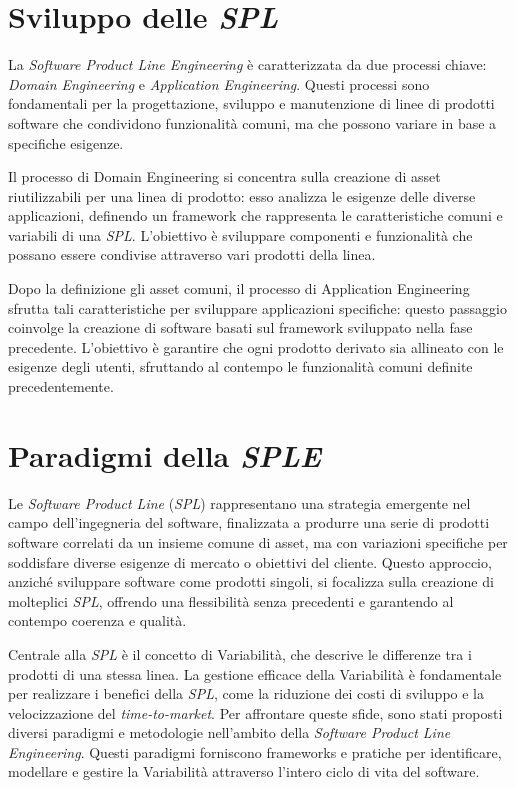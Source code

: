 \documentclass[12pt]{report}
\newcommand{\sple}{\textsl{SPLE}\xspace}
\newcommand{\spl}{\textsl{SPL}\xspace}
\begin{document}
\section{Sviluppo delle \spl}
La \textit{Software Product Line Engineering} è caratterizzata da due processi chiave: \textit{Domain Engineering} e \textit{Application Engineering}. Questi processi sono fondamentali per la progettazione, sviluppo e manutenzione di linee di prodotti software che condividono funzionalità comuni, ma che possono variare in base a specifiche esigenze.

Il processo di \textsf{Domain Engineering} si concentra sulla creazione di asset riutilizzabili per una linea di prodotto: esso analizza le esigenze delle diverse applicazioni, definendo un framework che rappresenta le caratteristiche comuni e variabili di una \spl. L'obiettivo è sviluppare componenti e funzionalità che possano essere condivise attraverso vari prodotti della linea.

Dopo la definizione gli asset comuni, il processo di \textsf{Application Engineering} sfrutta tali caratteristiche per sviluppare applicazioni specifiche: questo passaggio coinvolge la creazione di software basati sul framework sviluppato nella fase precedente. L'obiettivo è garantire che ogni prodotto derivato sia allineato con le esigenze degli utenti, sfruttando al contempo le funzionalità comuni definite precedentemente.




\section{Paradigmi della \sple}
Le \textit{Software Product Line} (\spl) rappresentano una strategia emergente nel campo dell'ingegneria del software, finalizzata a produrre una serie di prodotti software correlati da un insieme comune di asset, ma con variazioni specifiche per soddisfare diverse esigenze di mercato o obiettivi del cliente. Questo approccio, anziché sviluppare software come prodotti singoli, si focalizza sulla creazione di molteplici \spl, offrendo una flessibilità senza precedenti e garantendo al contempo coerenza e qualità.

Centrale alla \spl è il concetto di Variabilità, che descrive le differenze tra i prodotti di una stessa linea. La gestione efficace della Variabilità è fondamentale per realizzare i benefici della \spl, come la riduzione dei costi di sviluppo e la velocizzazione del \textit{time-to-market}. Per affrontare queste sfide, sono stati proposti diversi paradigmi e metodologie nell'ambito della \textit{Software Product Line Engineering}. Questi paradigmi forniscono frameworks e pratiche per identificare, modellare e gestire la Variabilità attraverso l'intero ciclo di vita del software.
\end{document}
